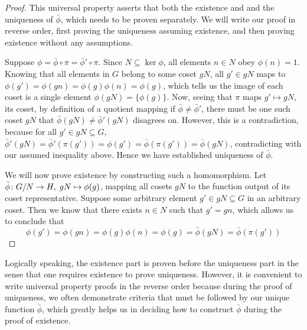 \begin{proof}
    This universal property asserts that
    both the existence and and the uniqueness of \(\bar{\phi}\),
    which needs to be proven separately.
    We will write our proof in reverse order,
    first proving the uniqueness assuming existence,
    and then proving existence without any assumptions.

    Suppose \(\phi = \bar{\phi}\circ\pi = \bar{\phi}'\circ\pi\).
    Since \(N \subseteq \ker\phi\),
    all elements \(n \in N\) obey \(\phi(n) = 1\).
    Knowing that all elements in \(G\) belong to some coset \(gN\),
    all \(g' \in gN\) maps to
    \(\phi(g') = \phi(gn) = \phi(g)\phi(n) = \phi(g)\),
    which tells us the image of each coset
    is a single element \(\phi(gN) = \{\phi(g)\}\).
    Now, seeing that \(\pi\) maps \(g' \mapsto gN\),
    its coset, by definition of a quotient mapping
    if \(\bar{\phi} \neq \bar{\phi}'\),
    there must be one such coset \(gN\)
    that \(\bar{\phi}(gN) \neq \bar{\phi}'(gN)\) disagrees on.
    However, this is a contradiction,
    because for all \(g' \in gN \subseteq G\),
    \(\bar{\phi}'(gN) = \bar{\phi}'(\pi(g')) = \phi(g')
    = \bar{\phi}(\pi(g')) = \bar{\phi}(gN)\),
    contradicting with our assumed inequality above.
    Hence we have established uniqueness of \(\bar{\phi}\).

    We will now prove existence by constructing such a homomorphism.
    Let \(\bar{\phi}\colon G/N\to H,\;gN\mapsto\phi(g)\),
    mapping all cosets \(gN\) to the function output
    of its coset representative.
    Suppose some arbitrary element \(g' \in gN \subseteq G\)
    in an arbitrary coset.
    Then we know that there exists \(n \in N\) such that \(g' = gn\),
    which allows us to conclude that
    \begin{equation*}
        \phi(g') = \phi(gn) = \phi(g)\phi(n) = \phi(g)
        = \bar{\phi}(gN) = \bar{\phi}(\pi(g'))
    \end{equation*}
\end{proof}
\begin{remark}
    Logically speaking,
    the existence part is proven before the uniqueness part
    in the sense that one requires existence to prove uniqueness.
    However, it is convenient to write universal property proofs
    in the reverse order
    because during the proof of uniqueness,
    we often demonstrate criteria that must be followed
    by our unique function \(\bar{\phi}\),
    which greatly helps us in deciding how to construct \(\bar{\phi}\)
    during the proof of existence.
\end{remark}

